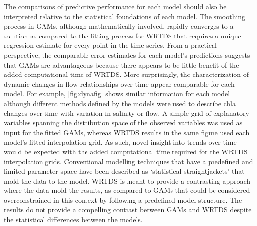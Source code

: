 \documentclass[letterpaper,12pt,oneside]{article}\usepackage[]{graphicx}\usepackage[]{color}
\begin{document}
The comparisons of predictive performance for each model should also be interpreted relative to the statistical foundations of each model.  The smoothing process in \acp{GAM}, although mathematically involved, rapidly converges to a solution as compared to the fitting process for \ac{WRTDS} that requires a unique regression estimate for every point in the time series.  From a practical perspective, the comparable error estimates for each model's predictions suggests that \acp{GAM} are advantageous because there appears to be little benefit of the added computational time of \ac{WRTDS}.  More surprisingly, the characterization of dynamic changes in flow relationships over time appear comparable for each model.  For example, \cref{fig:dynafig} shows similar information for each model although different methods defined by the models were used to describe \ac{chla} changes over time with variation in salinity or flow.  A simple grid of explanatory variables spanning the distribution space of the observed variables was used as input for the fitted \acp{GAM}, whereas \ac{WRTDS} results in the same figure used each model's fitted interpolation grid.  As such, novel insight into trends over time would be expected with the added computational time required for the \ac{WRTDS} interpolation grids.  Conventional modelling techniques that have a predefined and limited parameter space have been described as `statistical straightjackets' that mold the data to the model.  \ac{WRTDS} is meant to provide a contrasting approach where the data mold the results, as compared to \acp{GAM} that could be considered overconstrained in this context by following a predefined model structure.  The results do not provide a compelling contrast between \acp{GAM} and \ac{WRTDS} despite the statistical differences between the models.  
\end{document}
